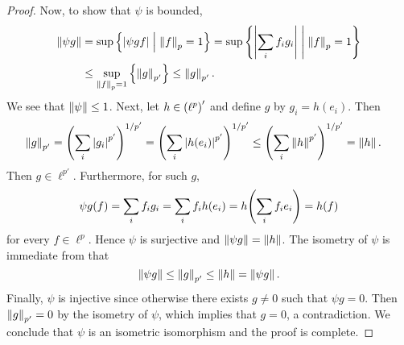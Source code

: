 \begin{proof}
    Now, to show that $\psi$ is bounded,
    \begin{equation*}
        \begin{split}
            \left\lVert {\psi g} \right\rVert &= \sup\left\{ \left\lvert {\psi gf} \right\rvert \;\middle\vert\; \left\lVert {f} \right\rVert_p = 1 \right\} 
            = \sup\left\{ \left\lvert {\sum_i f_ig_i} \right\rvert \;\middle\vert\; \left\lVert {f} \right\rVert_p = 1 \right\} \\
            &\leq \sup_{\left\lVert {f} \right\rVert_p = 1}\left\{ {\left\lVert {g} \right\rVert_{p'}} \right\} \leq \left\lVert {g} \right\rVert_{p'}.
        \end{split}
    \end{equation*}
    We see that $\left\lVert {\psi} \right\rVert\leq 1$. Next, let 
    $h\in\pth{\ell^p}'$ and define $g$ by $g_i = h(e_i)$. Then 
    \begin{equation*}
        \begin{split}
            \norm{g}_{p'} &= \pth{\sum_i \abs{g_i}^{p'}}^{1/p'} 
            = \pth{\sum_i \abs{h(e_i)}^{p'}}^{1/p'} 
            \leq \pth{\sum_i \norm{h}^{p'}}^{1/p'} 
            = \norm{h}.
        \end{split}
    \end{equation*}
    Then $g\in\ell^{p'}$. Furthermore, for such $g$,
    \begin{equation*}
        \psi g(f) = \sum_i f_ig_i = \sum_i f_ih(e_i) = h\pth{\sum_i f_ie_i} = h(f)
    \end{equation*} 
    for every $f\in\ell^p$. Hence $\psi$ is surjective and $\left\lVert {\psi g} \right\rVert 
    = \left\lVert {h} \right\rVert$. The isometry of $\psi$ is immediate from that 
    \begin{equation*}
        \left\lVert {\psi g} \right\rVert \leq \left\lVert {g} \right\rVert_{p'} \leq \left\lVert {h} \right\rVert = \left\lVert {\psi g} \right\rVert.
    \end{equation*} 
    Finally, $\psi$ is injective since otherwise there exists 
    $g\neq 0$ such that $\psi g = 0$. Then $\left\lVert {g} \right\rVert_{p'} = 0$ 
    by the isometry of $\psi$, which implies that $g = 0$, 
    a contradiction. We conclude that $\psi$ is an isometric 
    isomorphism and the proof is complete.
\end{proof}

